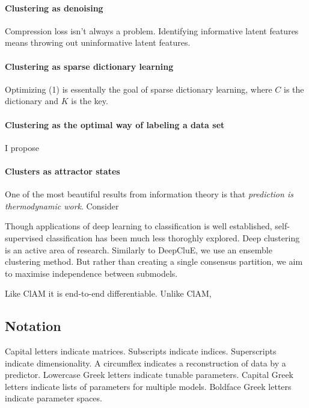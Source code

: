 \paragraph{Clustering as denoising}
Compression loss isn't always a problem.
Identifying informative latent features means throwing out uninformative latent features.

\paragraph{Clustering as sparse dictionary learning}
Optimizing (1) is essentally the goal of sparse dictionary learning, where
$C$ is the dictionary and $K$ is the key.

\paragraph{Clustering as the optimal way of labeling a data set}

I propose 

\paragraph{Clusters as attractor states}
One of the most beautiful results from information theory is that \textit{prediction is thermodynamic work}.
Consider 




Though applications of deep learning to classification is well established, self-supervised classification has been much less thoroghly explored.
Deep clustering is an active area of research\cite{ren2022deep}.
Similarly to DeepCluE\cite{huang2023deepclue}, we use an ensemble clustering method.
But rather than creating a single consensus partition, we aim to maximise independence between submodels.

Like ClAM\cite{saha2023endtoend} it is end-to-end differentiable.
Unlike ClAM,

\subsection{Notation}
Capital letters indicate matrices. Subscripts indicate indices. Superscripts indicate dimensionality.
A circumflex indicates a reconstruction of data by a predictor. Lowercase Greek letters indicate tunable parameters.
Capital Greek letters indicate lists of parameters for multiple models.
Boldface Greek letters indicate parameter spaces.

